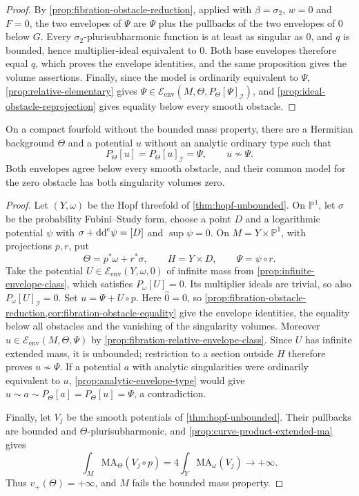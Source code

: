 \begin{proof}
By \cref{prop:fibration-obstacle-reduction}, applied with $\beta=\sigma_2$, $w=0$ and $F=0$, the two envelopes of $\Psi$ are $\Psi$ plus the pullbacks of the two envelopes of $0$ below $G$. Every $\sigma_2$-plurisubharmonic function is at least as singular as $0$, and $q$ is bounded, hence multiplier-ideal equivalent to $0$. Both base envelopes therefore equal $q$, which proves the envelope identities, and the same proposition gives the volume assertions. Finally, since the model is ordinarily equivalent to $\Psi$, \cref{prop:relative-elementary} gives $\Psi\in\mathcal E_{\mathrm{env}}(M,\Theta,P_\Theta[\Psi]_{\mathcal I})$, and \cref{prop:ideal-obstacle-reprojection} gives equality below every smooth obstacle.
\end{proof}

\begin{example}\label{ex:zero-volume-unbounded-mass-fibration}
On a compact fourfold without the bounded mass property, there are a Hermitian background $\Theta$ and a potential $u$ without an analytic ordinary type such that
\[
 P_\Theta[u]=P_\Theta[u]_{\mathcal I}=\Psi,
 \qquad u\not\sim\Psi.
\]
Both envelopes agree below every smooth obstacle, and their common model for the zero obstacle has both singularity volumes zero.
\end{example}
\begin{proof}
Let $(Y,\omega)$ be the Hopf threefold of \cref{thm:hopf-unbounded}. On $\mathbb P^1$, let $\sigma$ be the probability Fubini--Study form, choose a point $D$ and a logarithmic potential $\psi$ with $\sigma+\mathrm{dd}^{\mathrm{c}}\psi=[D]$ and $\sup\psi=0$. On $M=Y\times\mathbb P^1$, with projections $p,r$, put
\[
 \Theta=p^*\omega+r^*\sigma,\qquad
 H=Y\times D,\qquad \Psi=\psi\circ r.
\]
Take the potential $U\in\mathcal E_{\mathrm{env}}(Y,\omega,0)$ of infinite mass from \cref{prop:infinite-envelope-class}, which satisfies $P_\omega[U]=0$. Its multiplier ideals are trivial, so also $P_\omega[U]_{\mathcal I}=0$. Set $u=\Psi+U\circ p$. Here $\widehat 0=0$, so \cref{prop:fibration-obstacle-reduction,cor:fibration-obstacle-equality} give the envelope identities, the equality below all obstacles and the vanishing of the singularity volumes. Moreover $u\in\mathcal E_{\mathrm{env}}(M,\Theta,\Psi)$ by \cref{prop:fibration-relative-envelope-class}. Since $U$ has infinite extended mass, it is unbounded; restriction to a section outside $H$ therefore proves $u\not\sim\Psi$. If a potential $a$ with analytic singularities were ordinarily equivalent to $u$, \cref{prop:analytic-envelope-type} would give $u\sim a\sim P_\Theta[a]=P_\Theta[u]=\Psi$, a contradiction.

Finally, let $V_j$ be the smooth potentials of \cref{thm:hopf-unbounded}. Their pullbacks are bounded and $\Theta$-plurisubharmonic, and \cref{prop:curve-product-extended-ma} gives
\[
 \int_M\mathrm{MA}_\Theta(V_j\circ p)
   =4\int_Y\mathrm{MA}_\omega(V_j)\longrightarrow+\infty.
\]
Thus $v_+(\Theta)=+\infty$, and $M$ fails the bounded mass property.
\end{proof}

